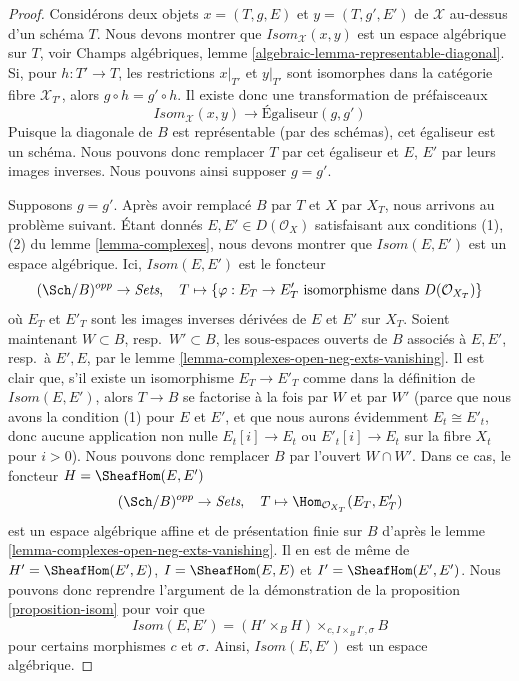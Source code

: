\begin{proof}
Considérons deux objets $x = (T, g, E)$ et $y = (T, g', E')$ de
$\mathcal{X}$ au-dessus d'un schéma $T$. Nous devons montrer que
$\mathit{Isom}_\mathcal{X}(x, y)$ est un espace algébrique sur $T$, voir
Champs algébriques, lemme \ref{algebraic-lemma-representable-diagonal}.
Si, pour $h : T' \to T$, les restrictions $x|_{T'}$ et $y|_{T'}$ sont
isomorphes dans la catégorie fibre $\mathcal{X}_{T'}$, alors
$g \circ h = g' \circ h$.
Il existe donc une transformation de préfaisceaux
$$
\mathit{Isom}_\mathcal{X}(x, y) \longrightarrow \text{Égaliseur}(g, g')
$$
Puisque la diagonale de $B$ est représentable (par des schémas), cet égaliseur
est un schéma. Nous pouvons donc remplacer $T$ par cet égaliseur et $E$, $E'$
par leurs images inverses. Nous pouvons ainsi supposer $g = g'$.

\medskip\noindent
Supposons $g = g'$. Après avoir remplacé $B$ par $T$ et $X$ par $X_T$, nous
arrivons au problème suivant. Étant donnés $E, E' \in D(\mathcal{O}_X)$
satisfaisant aux conditions (1), (2) du lemme \ref{lemma-complexes}, nous devons
montrer que $\mathit{Isom}(E, E')$ est un espace algébrique.
Ici, $\mathit{Isom}(E, E')$ est le foncteur
$$
(\Sch/B)^{opp} \to \textit{Sets},\quad
T \mapsto \{\varphi : E_T \to E'_T
\text{ isomorphisme dans }D(\mathcal{O}_{X_T})\}
$$
où $E_T$ et $E'_T$ sont les images inverses dérivées de $E$ et $E'$ sur
$X_T$. Soient maintenant $W \subset B$, resp.\ $W' \subset B$, les sous-espaces
ouverts de $B$ associés à $E, E'$, resp.\ à $E', E$, par le
lemme \ref{lemma-complexes-open-neg-exts-vanishing}.
Il est clair que, s'il existe un isomorphisme $E_T \to E'_T$ comme dans la
définition de $\mathit{Isom}(E, E')$, alors $T \to B$ se factorise à la fois
par $W$ et par $W'$ (parce que nous avons la condition (1) pour $E$ et $E'$, et
que nous aurons évidemment $E_t \cong E'_t$, donc aucune application non nulle
$E_t[i] \to E_t$ ou $E'_t[i] \to E_t$ sur la fibre $X_t$ pour $i > 0$).
Nous pouvons donc remplacer $B$ par l'ouvert $W \cap W'$.
Dans ce cas, le foncteur $H = \SheafHom(E, E')$
$$
(\Sch/B)^{opp} \to \textit{Sets},\quad T \mapsto
\Hom_{\mathcal{O}_{X_T}}(E_T, E'_T)
$$
est un espace algébrique affine et de présentation finie sur $B$ d'après le
lemme \ref{lemma-complexes-open-neg-exts-vanishing}.
Il en est de même de
$H' = \SheafHom(E', E)$,
$I = \SheafHom(E, E)$ et
$I' = \SheafHom(E', E')$.
Nous pouvons donc reprendre l'argument de la démonstration de la
proposition \ref{proposition-isom} pour voir que
$$
\mathit{Isom}(E, E') = (H' \times_B H) \times_{c, I \times_B I', \sigma} B
$$
pour certains morphismes $c$ et $\sigma$. Ainsi,
$\mathit{Isom}(E, E')$ est un espace algébrique.
\end{proof}

